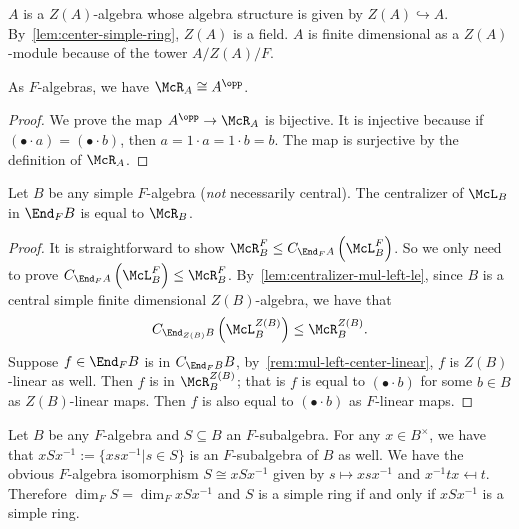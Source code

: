 \begin{remark}
  $A$ is a $Z(A)$-algebra whose algebra structure is given by
  $Z(A)\hookrightarrow A$. By~\cref{lem:center-simple-ring}, $Z(A)$ is a field.
  $A$ is finite dimensional as a $Z(A)$-module because of the tower $A/Z(A)/F$.
\end{remark}

 \begin{lemma}\label{lem:mul-right-iso-opp}
   As $F$-algebras, we have $\McR_{A}\cong A^{\opp}$. \leanok
 \end{lemma}
 \begin{proof}
   We prove the map $A^{\opp} \to \McR_{A}$ is bijective. It is injective
   because if $\left(\bullet \cdot a\right) = \left(\bullet\cdot b\right)$, then
   $a = 1 \cdot a = 1 \cdot b = b$. The map is surjective by the definition of
   $\McR_{A}$.
 \end{proof}
 \begin{lemma}\label{lem:centralizer-mul-left-eq-mul-right}
   Let $B$ be any simple $F$-algebra ({\em not\/} necessarily central). The
   centralizer of $\McL_{B}$ in $\End_{F}B$ is equal to $\McR_{B}$.
   \leanok
 \end{lemma}
 \begin{proof}
   It is straightforward to show
   $\McR_{B}^{F}\le C_{\End_{F}A}\left(\McL_{B}^{F}\right)$. So we only need to
   prove $C_{\End_{F}A}\left(\McL_{B}^{F}\right)\le \McR_{B}^{F}$.
   By~\cref{lem:centralizer-mul-left-le}, since $B$ is a central simple finite
   dimensional $Z(B)$-algebra, we have that
   \[
     C_{\End_{Z(B)}B}\left(\McL_{B}^{Z(B)}\right) \le \McR_{B}^{Z(B)}.
   \]
   Suppose $f\in\End_{F}B$ is in $C_{\End_{F}B}B$, by~\cref{rem:mul-left-center-linear}, $f$ is $Z(B)$-linear as well. Then $f$ is
   in $\McR_{B}^{Z(B)}$; that is $f$ is equal to $\left(\bullet\cdot b\right)$
   for some $b \in B$ as $Z(B)$-linear maps. Then $f$ is also equal to
   $\left(\bullet\cdot b\right)$ as $F$-linear maps.
 \end{proof}

 \begin{construction}
   Let $B$ be any $F$-algebra and $S\subseteq B$ an $F$-subalgebra. For any
   $x\in B^{\times}$, we have that $x S x^{-1}:=\{xsx^{-1}|s\in S\}$ is an
   $F$-subalgebra of $B$ as well. We have the obvious $F$-algebra isomorphism
   $S \cong xSx^{-1}$ given by $s\mapsto xsx^{-1}$ and $x^{-1}tx\mapsfrom t$.
   Therefore $\dim_{F}S=\dim_{F}xSx^{-1}$ and $S$ is a simple ring if and only
   if $xSx^{-1}$ is a simple ring.
   \leanok
 \end{construction}

